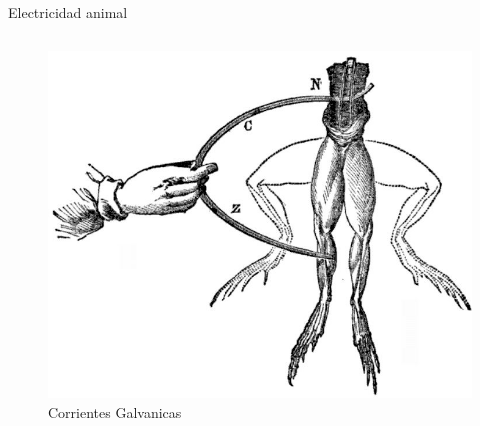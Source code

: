 \documentclass{beamer}
\begin{document}
\begin{frame}{Electricidad animal}
\begin{columns}
    \begin{column}{0.5\textwidth}
        \begin{figure}
            \centering
            \includegraphics[width=1\linewidth]{galvani2.jpg}
            \caption{Corrientes Galvanicas}
            \label{fig:my_label}
        \end{figure}
    \end{column}
    \end{columns}
\end{frame}
\end{document}
